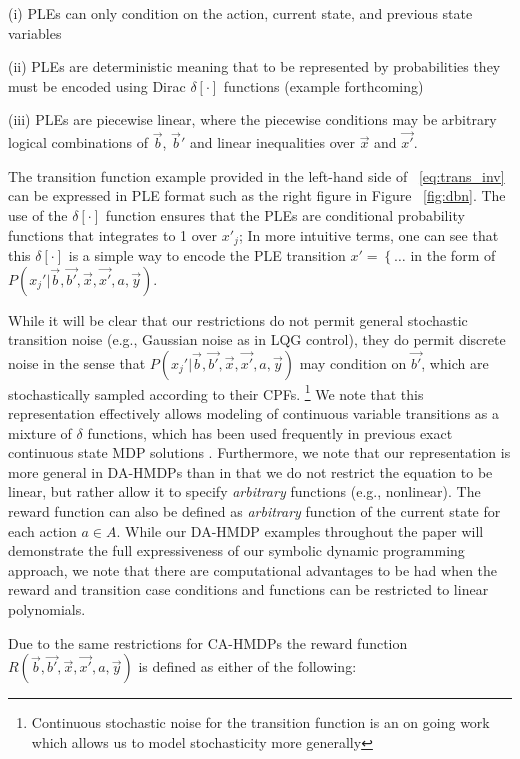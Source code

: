 \documentclass[twoside,11pt]{article}
\begin{document}
(i) PLEs can only condition on the
action, current state, and previous state variables

(ii) PLEs are deterministic meaning that to be represented by probabilities they
must be encoded using Dirac $\delta[\cdot]$ functions (example forthcoming)

(iii) PLEs are piecewise linear, where the piecewise conditions may be arbitrary logical combinations of $\vec{b}$, $\vec{b}'$ 
and linear inequalities over $\vec{x}$ and $\vec{x'}$.  

The transition function example provided in the left-hand side of ~\eqref{eq:trans_inv} can be expressed in PLE format such as the right figure in Figure ~\ref{fig:dbn}.
The use of the $\delta[\cdot]$ function ensures that the PLEs are conditional
probability functions that integrates to 1 over $x'_j$; In more intuitive
terms, one can see that this $\delta[\cdot]$ is a simple way to encode
the PLE transition $x' = \left\{ \ldots \right.$ in the form of 
$P(x_j'|\vec{b},\vec{b'},\vec{x},\vec{x'},a,\vec{y})$.

While it will be clear that our restrictions do not permit general stochastic transition noise (e.g., Gaussian noise as in LQG control), they do permit discrete noise in the sense that
$P(x_j'|\vec{b},\vec{b'},\vec{x},\vec{x'},a,\vec{y})$ may condition on
$\vec{b'}$, which are stochastically sampled according to their CPFs.
\footnote{Continuous stochastic noise for the transition function is an on going work which allows us to model stochasticity more generally}
We note that this representation effectively allows modeling of
continuous variable transitions as a mixture of $\delta$ functions,
which has been used frequently in previous exact continuous state MDP
solutions \cite{feng04,hao09}.
Furthermore, we note that our
representation is more general in DA-HMDPs than \cite{feng04,li05,hao09} in that
we do not restrict the equation to be linear, but rather
allow it to specify \emph{arbitrary} functions (e.g., nonlinear). The reward function can also be defined as \emph{arbitrary} function of the current state for each action $a \in A$. 
While our DA-HMDP examples throughout the paper will demonstrate the full expressiveness of our symbolic dynamic programming approach, we note that there are computational advantages to be had when the reward and transition case conditions and functions can be restricted to linear polynomials.  

Due to the same restrictions for CA-HMDPs the reward function $R(\vec{b},\vec{b'},\vec{x},\vec{x'}, a,\vec{y})$ is defined as either of the following:
\end{document}
